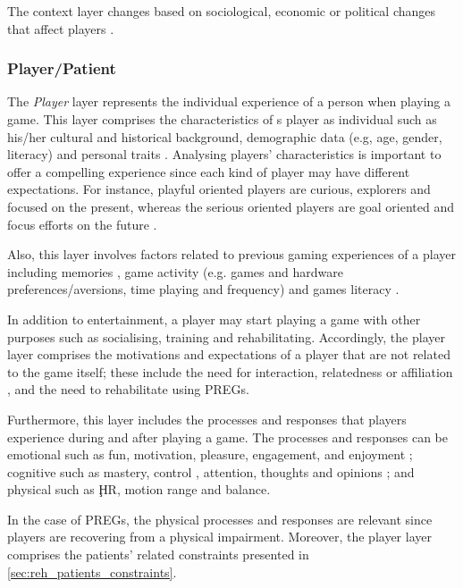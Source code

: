The context layer changes based on sociological, economic or political changes that affect players \autocite{Nackea2}.

\subsubsection*{Player/Patient}

The \textit{Player} layer represents the individual experience of a person when playing a game. This layer comprises the characteristics of s player as individual \autocite{Elson2014} such as his/her cultural \autocite{Elson2014} and historical \autocite{Mayra} background, demographic data (e.g, age, gender, literacy) \autocite{Elson2014,Fernandez2008,Ferrara} and personal traits \autocite{Elson2014}. Analysing players' characteristics is important to offer a compelling experience since each kind of player may have different expectations. For instance, playful oriented players are curious, explorers and focused on the present, whereas the serious oriented players are goal oriented and focus efforts on the future \autocite{Fernandez2008}.

Also, this layer involves factors related to previous gaming experiences of a player including memories \autocite{Elson2014}, game activity (e.g. games and hardware preferences/aversions, time playing and frequency) \autocite{Fernandez2008,Nackea2,Nacked,Mayra} and games literacy \autocite{Mayra}.

In addition to entertainment, a player may start playing a game with other purposes such as socialising, training and rehabilitating. Accordingly, the player layer comprises the motivations and expectations of a player that are not related to the game itself; these include the need for interaction, relatedness or affiliation \autocite{DeKort2007b,Mayra}, and the need to rehabilitate using \acp{PREG}.

Furthermore, this layer includes the processes and responses that players experience during and after playing a game. The processes and responses can be emotional such as fun, motivation, pleasure, engagement, \autocite{Fernandez2008,Ferrara} and enjoyment \autocite{Nacked}; cognitive such as mastery, control \autocite{Ferrara}, attention, thoughts and opinions \autocite{Fernandez2008}; and physical such as \c{HR}, motion range and balance.

In the case of \acp{PREG}, the physical processes and responses are relevant since players are recovering from a physical impairment. Moreover, the player layer comprises the patients' related constraints presented in \autoref{sec:reh_patients_constraints}.

